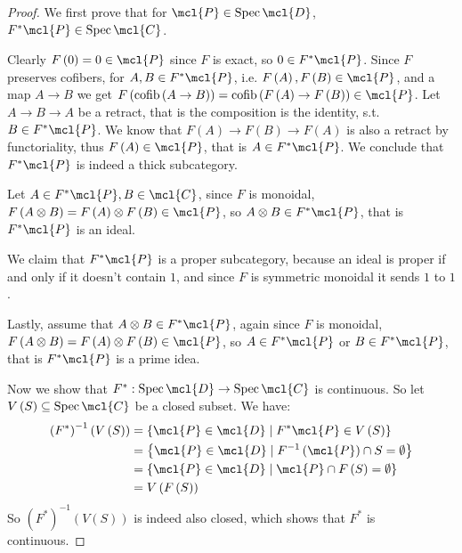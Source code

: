 \begin{proof}
	We first prove that for $\mcl{P} \in \spec \mcl{D}$, $F^*\mcl{P} \in \spec \mcl{C}$.
	
	Clearly $F\left(0\right) = 0 \in \mcl{P}$ since $F$ is exact, so $0 \in F^*\mcl{P}$.
	Since $F$ preserves cofibers, for $A,B \in F^*\mcl{P}$, i.e. $F\left(A\right), F\left(B\right) \in \mcl{P}$, and a map $A \to B$ we get
	$
	F\left(\cofib\left(A \to B\right)\right)
	= \cofib\left(F\left(A\right) \to F\left(B\right)\right)
	\in \mcl{P}
	$.
	Let $A \to B \to A$ be a retract, that is the composition is the identity, s.t. $B \in F^*\mcl{P}$. We know that $F\left(A\right) \to F\left(B\right) \to F\left(A\right)$ is also a retract by functoriality, thus $F\left(A\right) \in \mcl{P}$, that is $A \in F^*\mcl{P}$.
	We conclude that $F^*\mcl{P}$ is indeed a thick subcategory.
	
	Let $A \in F^*\mcl{P}, B \in \mcl{C}$, since $F$ is monoidal, $F\left(A \otimes B\right) = F\left(A\right) \otimes F\left(B\right) \in \mcl{P}$, so $A \otimes B \in F^*\mcl{P}$, that is $F^*\mcl{P}$ is an ideal.
	
	We claim that $F^*\mcl{P}$ is a proper subcategory, because an ideal is proper if and only if it doesn't contain $1$, and since $F$ is symmetric monoidal it sends $1$ to $1$.
	
	Lastly, assume that $A \otimes B \in F^*\mcl{P}$, again since $F$ is monoidal, $F\left(A \otimes B\right) = F\left(A\right) \otimes F\left(B\right) \in \mcl{P}$, so $A \in F^*\mcl{P}$ or $B \in F^*\mcl{P}$, that is $F^*\mcl{P}$ is a prime idea.
	
	Now we show that $F^*: \spec \mcl{D} \to \spec \mcl{C}$ is continuous.
	So let $V\left(S\right) \subseteq \spec \mcl{C}$ be a closed subset.
	We have:
	\begin{align*}
		\left(F^*\right)^{-1}\left(V\left(S\right)\right)
		&= \left\{ \mcl{P} \in \mcl{D} \mid F^*\mcl{P} \in V\left(S\right) \right\}\\
		&= \left\{ \mcl{P} \in \mcl{D} \mid F^{-1}\left(\mcl{P}\right) \cap S = \emptyset \right\}\\
		&= \left\{ \mcl{P} \in \mcl{D} \mid \mcl{P} \cap F\left(S\right) = \emptyset \right\}\\
		&= V\left(F\left(S\right)\right)
	\end{align*}
	So $\left(F^*\right)^{-1}\left(V\left(S\right)\right)$ is indeed also closed, which shows that $F^*$ is continuous.
\end{proof}

